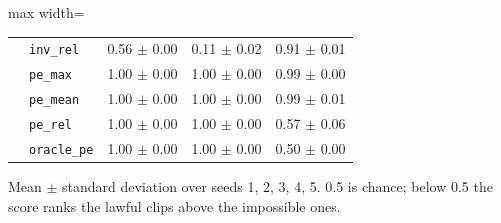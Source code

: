 \begin{table}[t]
\begin{adjustbox}{max width=\linewidth}
\begin{tabular}{llccc}
 & \texttt{inv\_rel} & 0.56 $\pm$ 0.00 & 0.11 $\pm$ 0.02 & 0.91 $\pm$ 0.01\\
 & \texttt{pe\_max} & 1.00 $\pm$ 0.00 & 1.00 $\pm$ 0.00 & 0.99 $\pm$ 0.00\\
 & \texttt{pe\_mean} & 1.00 $\pm$ 0.00 & 1.00 $\pm$ 0.00 & 0.99 $\pm$ 0.01\\
 & \texttt{pe\_rel} & 1.00 $\pm$ 0.00 & 1.00 $\pm$ 0.00 & 0.57 $\pm$ 0.06\\
 & \texttt{oracle\_pe} & 1.00 $\pm$ 0.00 & 1.00 $\pm$ 0.00 & 0.50 $\pm$ 0.00\\
\bottomrule
\end{tabular}\end{adjustbox}
\par\smallskip\footnotesize Mean $\pm$ standard deviation over seeds 1, 2, 3, 4, 5. 0.5 is chance; below 0.5 the score ranks the lawful clips above the impossible ones.
\end{table}
